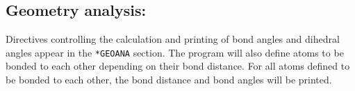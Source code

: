 %
%
%
%
%
%

\subsection{Geometry analysis: }

Directives controlling the calculation and printing of bond angles
and dihedral angles appear in the \verb|*GEOANA| section. The program will also define atoms
to be bonded to each other depending on their bond distance. For all atoms
defined to be bonded to each other, the bond distance and bond angles
will be printed.

